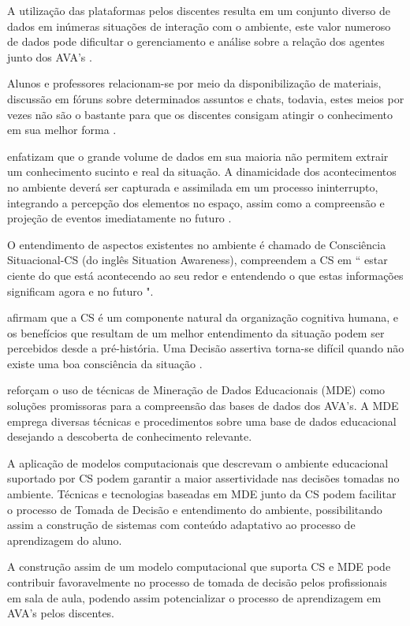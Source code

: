 \documentclass[12pt]{article}
\begin{document}
A utilização das plataformas pelos discentes resulta em um conjunto diverso de dados em inúmeras situações de interação com o ambiente, este valor numeroso de dados pode dificultar o gerenciamento e análise sobre a relação dos agentes junto dos AVA's \cite{Rabelo_et_al2017}. 

Alunos e professores relacionam-se por meio da disponibilização de materiais, discussão em fóruns sobre determinados assuntos e chats, todavia, estes meios por vezes não são o bastante para que os discentes consigam atingir o conhecimento em sua melhor forma \cite{Falci_et_al_2018}. 

\cite{Endsley2012} enfatizam que o grande volume de dados em sua maioria não permitem extrair um conhecimento sucinto e real da situação. A dinamicidade dos acontecimentos no ambiente deverá ser capturada e assimilada em um processo ininterrupto, integrando a percepção dos elementos no espaço, assim como a compreensão e projeção de eventos imediatamente no futuro \cite{Silva_et_al_2012}.

O entendimento de aspectos existentes no ambiente é chamado de Consciência Situacional-CS (do inglês Situation Awareness), \cite[p.13]{Endsley2012} compreendem a CS em `` estar ciente do que está acontecendo ao seu redor e entendendo o que estas informações significam agora e no futuro ". 

\cite{Roy_Breton_Rousseau_2007} afirmam que a CS é um componente natural da organização cognitiva humana, e os benefícios que resultam de um melhor entendimento da situação podem ser percebidos desde a pré-história. Uma Decisão assertiva torna-se difícil quando não existe uma boa consciência da situação \cite{Endsley2012}. 

\cite{Leite_et_al_2016} reforçam o uso de técnicas de Mineração de Dados Educacionais (MDE) como soluções promissoras para a compreensão das bases de dados dos AVA's. A MDE emprega diversas técnicas e procedimentos sobre uma base de dados educacional desejando a descoberta de conhecimento relevante. 

A aplicação de modelos computacionais que descrevam o ambiente educacional suportado por CS podem garantir a maior assertividade nas decisões tomadas no ambiente. Técnicas e tecnologias baseadas em MDE junto da CS podem facilitar o processo de Tomada de Decisão e entendimento do ambiente, possibilitando assim a construção de sistemas com conteúdo adaptativo ao processo de aprendizagem do aluno. 

A construção assim de um modelo computacional que suporta CS e MDE pode contribuir favoravelmente no processo de tomada de decisão pelos profissionais em sala de aula, podendo assim potencializar o processo de aprendizagem em AVA's pelos discentes.
\end{document}
